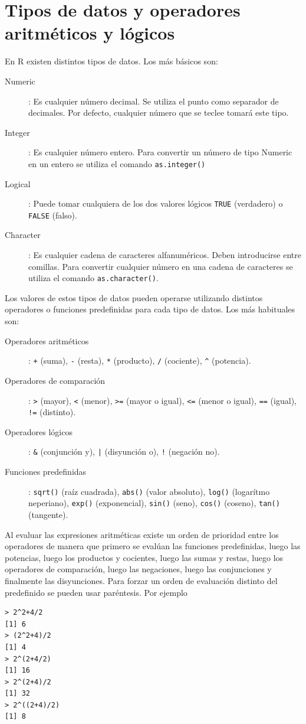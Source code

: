 \section{Tipos de datos y operadores aritméticos y lógicos}
En R existen distintos tipos de datos. Los más básicos son:
\begin{description}
\item[Numeric]: Es cualquier número decimal. Se utiliza el punto como separador de decimales. Por defecto, cualquier
número que se teclee tomará este tipo.
\item[Integer]: Es cualquier número entero. Para convertir un número de tipo Numeric en un entero se utiliza el comando
\lstinline{as.integer()}
\item[Logical]: Puede tomar cualquiera de los dos valores lógicos \lstinline{TRUE} (verdadero) o \lstinline{FALSE}
(falso).
\item[Character]: Es cualquier cadena de caracteres alfanuméricos. Deben introducirse entre comillas. Para convertir
cualquier número en una cadena de caracteres se utiliza el comando \lstinline{as.character()}.
\end{description}

Los valores de estos tipos de datos pueden operarse utilizando distintos operadores o funciones predefinidas para cada
tipo de datos. Los más habituales son:
\begin{description}
\item[Operadores aritméticos]: \lstinline{+} (suma), \lstinline{-} (resta), \lstinline{*} (producto), \lstinline{/}
(cociente), \lstinline{^} (potencia).
\item[Operadores de comparación]: \lstinline{>} (mayor), \lstinline{<} (menor), \lstinline{>=} (mayor o igual),
\lstinline{<=} (menor o igual), \lstinline{==} (igual), \lstinline{!=} (distinto).
\item[Operadores lógicos]:  \lstinline{&} (conjunción y), \lstinline{|} (disyunción o), \lstinline{!} (negación no).
\item[Funciones predefinidas]: \lstinline{sqrt()} (raíz cuadrada), \lstinline{abs()} (valor absoluto),
\lstinline{log()} (logarítmo neperiano), \lstinline{exp()} (exponencial), \lstinline{sin()} (seno), \lstinline{cos()}
(coseno), \lstinline{tan()} (tangente).
\end{description}

Al evaluar las expresiones aritméticas existe un orden de prioridad entre los operadores de manera que primero se
evalúan las funciones predefinidas, luego las potencias, luego los productos y cocientes, luego las sumas y restas,
luego los operadores de comparación, luego las negaciones, luego las conjunciones y finalmente las disyunciones. Para
forzar un orden de evaluación distinto del predefinido se pueden usar paréntesis. Por ejemplo
\begin{lstlisting}
> 2^2+4/2
[1] 6
> (2^2+4)/2
[1] 4
> 2^(2+4/2)
[1] 16
> 2^(2+4)/2
[1] 32
> 2^((2+4)/2)
[1] 8
\end{lstlisting}

